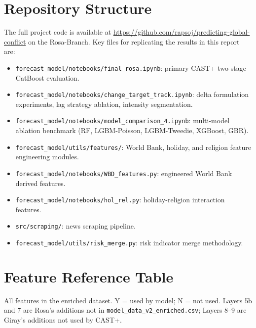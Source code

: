 \documentclass[12pt,a4paper]{article}
\begin{document}
\section{Repository Structure}

The full project code is available at
\url{https://github.com/rapsoj/predicting-global-conflict} on the
Rosa-Branch. Key files for replicating the results in this report are:

\begin{itemize}
    \item \texttt{forecast\_model/notebooks/final\_rosa.ipynb}: primary
          CAST+ two-stage CatBoost evaluation.
    \item \texttt{forecast\_model/notebooks/change\_target\_track.ipynb}:
          delta formulation experiments, lag strategy ablation,
          intensity segmentation.
    \item \texttt{forecast\_model/notebooks/model\_comparison\_4.ipynb}:
          multi-model ablation benchmark (RF, LGBM-Poisson,
          LGBM-Tweedie, XGBoost, GBR).
    \item \texttt{forecast\_model/utils/features/}: World Bank, holiday,
          and religion feature engineering modules.
    \item \texttt{forecast\_model/notebooks/WBD\_features.py}: engineered
          World Bank derived features.
    \item \texttt{forecast\_model/notebooks/hol\_rel.py}: holiday-religion
          interaction features.
    \item \texttt{src/scraping/}: news scraping pipeline.
    \item \texttt{forecast\_model/utils/risk\_merge.py}: risk indicator
          merge methodology.
\end{itemize}

\section{Feature Reference Table}

All features in the enriched dataset. Y = used by model; N = not
used. Layers 5b and 7 are Rosa's additions not in
\texttt{model\_data\_v2\_enriched.csv}; Layers 8--9 are Giray's
additions not used by CAST+.
\end{document}
